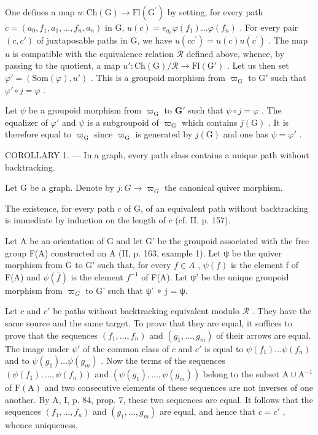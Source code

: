 One defines a map \(u\colon \mathrm{Ch}(\mathrm{G})\to \mathrm{Fl}(\mathrm{G}^{\prime})\) by setting, for every path \(c = (a_0,f_1,a_1,\ldots ,f_n,a_n)\) in G, \(u(c) = e_{a_0}\varphi (f_1)\dots \varphi (f_n)\) . For every pair \((c,c')\) of juxtaposable paths in G, we have \(u(cc^{\prime}) = u(c)u(c^{\prime})\) . The map \(u\) is compatible with the equivalence relation \(\mathcal{R}\) defined above, whence, by passing to the quotient, a map \(u'\colon \mathrm{Ch}(\mathrm{G}) / \mathcal{R}\to \mathrm{Fl}(\mathrm{G}')\) . Let us then set \(\varphi ' = (\mathrm{Som}(\varphi),u')\) . This is a groupoid morphism from \(\varpi_{\mathrm{G}}\) to \(\mathrm{G}'\) such that \(\varphi '\circ j = \varphi\) .

Let \(\psi\) be a groupoid morphism from \(\varpi_{\mathrm{G}}\) to \(\mathbf{G}'\) such that \(\psi \circ j = \varphi\) . The equalizer of \(\varphi'\) and \(\psi\) is a subgroupoid of \(\varpi_{\mathrm{G}}\) which contains \(j(\mathrm{G})\) . It is therefore equal to \(\varpi_{\mathrm{G}}\) since \(\varpi_{\mathrm{G}}\) is generated by \(j(\mathrm{G})\) and one has \(\psi = \varphi'\) .

COROLLARY 1. --- In a graph, every path class contains a unique path without backtracking.

Let G be a graph. Denote by \(j\colon G\to\varpi_{G}\) the canonical quiver morphism.

The existence, for every path \(c\) of G, of an equivalent path without backtracking is immediate by induction on the length of \(c\) (cf. II, p. 157).

Let A be an orientation of G and let G' be the groupoid associated with the free group F(A) constructed on A (II, p. 163, example 1). Let ψ be the quiver morphism from G to G' such that, for every \(f \in A\) , \(\psi(f)\) is the element f of F(A) and \(\psi(\overline{f})\) is the element \(f^{-1}\) of F(A). Let ψ' be the unique groupoid morphism from \(\varpi_{G}\) to G' such that ψ' ∘ j = ψ.

Let \(c\) and \(c'\) be paths without backtracking equivalent modulo \(\mathcal{R}\) . They have the same source and the same target. To prove that they are equal, it suffices to prove that the sequences \((f_1, \ldots, f_n)\) and \((g_1, \ldots, g_m)\) of their arrows are equal. The image under \(\psi'\) of the common class of \(c\) and \(c'\) is equal to \(\psi(f_1) \ldots \psi(f_n)\) and to \(\psi(g_1) \ldots \psi(g_m)\) . Now the terms of the sequences \((\psi(f_1), \ldots, \psi(f_n))\) and \((\psi(g_1), \ldots, \psi(g_m))\) belong to the subset \(\mathrm{A} \cup \mathrm{A}^{-1}\) of \(\mathrm{F(A)}\) and two consecutive elements of these sequences are not inverses of one another. By A, I, p. 84, prop. 7, these two sequences are equal. It follows that the sequences \((f_{1},\ldots,f_{n})\) and \((g_{1},\ldots,g_{m})\) are equal, and hence that \(c=c'\) , whence uniqueness.

